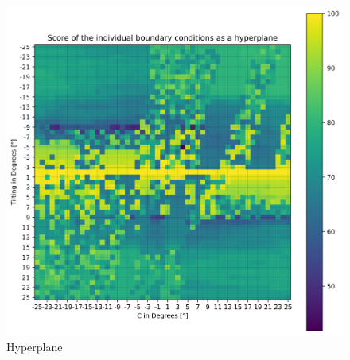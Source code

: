 \begin{figure}[H]
	\centerline{\includegraphics[width=1\textwidth]{figures/best_2D_3.png}}
	\caption{Hyperplane}
	\label{best_2D}
\end{figure}

\newpage
